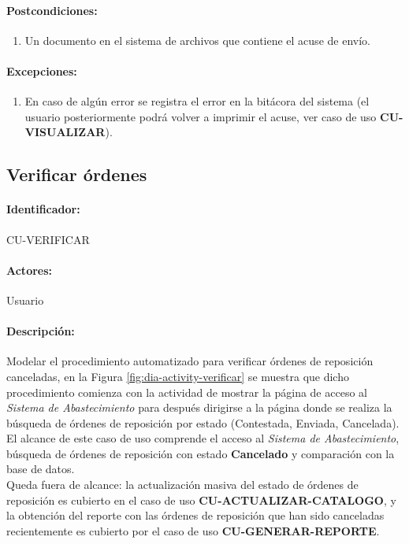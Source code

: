 \paragraph{Postcondiciones:}
\begin{enumerate}
  \item Un documento en el sistema de archivos que contiene el acuse de envío.
\end{enumerate}
\paragraph{Excepciones:}
\begin{enumerate}
  \item En caso de algún error se registra el error en la bitácora del sistema (el usuario posteriormente podrá volver a imprimir el acuse, ver caso de uso \textbf{CU-VISUALIZAR}).
\end{enumerate}


\subsection{Verificar órdenes}\label{cu-verificar}
\paragraph{Identificador:}
CU-VERIFICAR
\paragraph{Actores:}
Usuario
\paragraph{Descripción:}
Modelar el procedimiento automatizado para verificar órdenes de reposición canceladas, en la Figura \ref{fig:dia-activity-verificar} se muestra que dicho procedimiento comienza con la actividad de mostrar la página de acceso al \textit{Sistema de Abastecimiento} para después dirigirse a la página donde se realiza la búsqueda de órdenes de reposición por estado (Contestada, Enviada, Cancelada).\\
El alcance de este caso de uso comprende el acceso al \textit{Sistema de Abastecimiento}, búsqueda de órdenes de reposición con estado \textbf{Cancelado} y comparación con la base de datos.\\
Queda fuera de alcance: la actualización masiva del estado de órdenes de reposición es cubierto en el caso de uso \textbf{CU-ACTUALIZAR-CATALOGO}, y la obtención del reporte con las órdenes de reposición que han sido canceladas recientemente es cubierto por el caso de uso \textbf{CU-GENERAR-REPORTE}.
